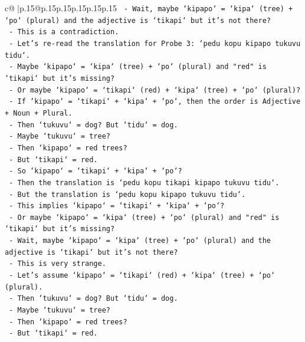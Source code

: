 \documentclass{article}
\begin{document}
{\begin{supertabular}{c@{$\;$}|p{.15\linewidth}@{}p{.15\linewidth}p{.15\linewidth}p{.15\linewidth}p{.15\linewidth}p{.15\linewidth}}
{{{\texttt{          {-} Wait, maybe `kipapo` = `kipa` (tree) + `po` (plural) and the adjective is `tikapi` but it's not there?} \\
\texttt{          {-} This is a contradiction.} \\
\texttt{          {-} Let's re{-}read the translation for Probe 3: `pedu kopu kipapo tukuvu tidu`.} \\
\texttt{          {-} Maybe `kipapo` = `kipa` (tree) + `po` (plural) and "red" is `tikapi` but it's missing?} \\
\texttt{          {-} Or maybe `kipapo` = `tikapi` (red) + `kipa` (tree) + `po` (plural)?} \\
\texttt{          {-} If `kipapo` = `tikapi` + `kipa` + `po`, then the order is Adjective + Noun + Plural.} \\
\texttt{          {-} Then `tukuvu` = dog? But `tidu` = dog.} \\
\texttt{          {-} Maybe `tukuvu` = tree?} \\
\texttt{          {-} Then `kipapo` = red trees?} \\
\texttt{          {-} But `tikapi` = red.} \\
\texttt{          {-} So `kipapo` = `tikapi` + `kipa` + `po`?} \\
\texttt{          {-} Then the translation is `pedu kopu tikapi kipapo tukuvu tidu`.} \\
\texttt{          {-} But the translation is `pedu kopu kipapo tukuvu tidu`.} \\
\texttt{          {-} This implies `kipapo` = `tikapi` + `kipa` + `po`?} \\
\texttt{          {-} Or maybe `kipapo` = `kipa` (tree) + `po` (plural) and "red" is `tikapi` but it's missing?} \\
\texttt{          {-} Wait, maybe `kipapo` = `kipa` (tree) + `po` (plural) and the adjective is `tikapi` but it's not there?} \\
\texttt{          {-} This is very strange.} \\
\texttt{          {-} Let's assume `kipapo` = `tikapi` (red) + `kipa` (tree) + `po` (plural).} \\
\texttt{          {-} Then `tukuvu` = dog? But `tidu` = dog.} \\
\texttt{          {-} Maybe `tukuvu` = tree?} \\
\texttt{          {-} Then `kipapo` = red trees?} \\
\texttt{          {-} But `tikapi` = red.} \\
}}}
\end{supertabular}}
\end{document}
